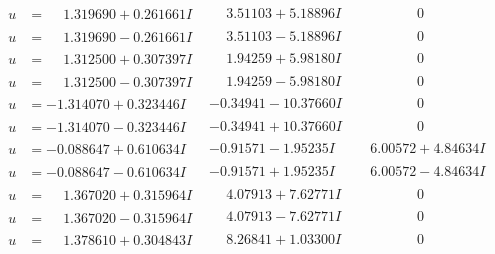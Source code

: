 \documentclass[1p]{elsarticle_modified}
\theoremstyle{definition}
\begin{document}
$$\begin{array}{c|c|c}
\begin{aligned}
u &= \phantom{-}1.319690 + 0.261661 I\end{aligned}
 & \phantom{-}3.51103 + 5.18896 I & \phantom{-0.000000 } 0 \\ \hline\begin{aligned}
u &= \phantom{-}1.319690 - 0.261661 I\end{aligned}
 & \phantom{-}3.51103 - 5.18896 I & \phantom{-0.000000 } 0 \\ \hline\begin{aligned}
u &= \phantom{-}1.312500 + 0.307397 I\end{aligned}
 & \phantom{-}1.94259 + 5.98180 I & \phantom{-0.000000 } 0 \\ \hline\begin{aligned}
u &= \phantom{-}1.312500 - 0.307397 I\end{aligned}
 & \phantom{-}1.94259 - 5.98180 I & \phantom{-0.000000 } 0 \\ \hline\begin{aligned}
u &= -1.314070 + 0.323446 I\end{aligned}
 & -0.34941 - 10.37660 I & \phantom{-0.000000 } 0 \\ \hline\begin{aligned}
u &= -1.314070 - 0.323446 I\end{aligned}
 & -0.34941 + 10.37660 I & \phantom{-0.000000 } 0 \\ \hline\begin{aligned}
u &= -0.088647 + 0.610634 I\end{aligned}
 & -0.91571 - 1.95235 I & \phantom{-}6.00572 + 4.84634 I \\ \hline\begin{aligned}
u &= -0.088647 - 0.610634 I\end{aligned}
 & -0.91571 + 1.95235 I & \phantom{-}6.00572 - 4.84634 I \\ \hline\begin{aligned}
u &= \phantom{-}1.367020 + 0.315964 I\end{aligned}
 & \phantom{-}4.07913 + 7.62771 I & \phantom{-0.000000 } 0 \\ \hline\begin{aligned}
u &= \phantom{-}1.367020 - 0.315964 I\end{aligned}
 & \phantom{-}4.07913 - 7.62771 I & \phantom{-0.000000 } 0 \\ \hline\begin{aligned}
u &= \phantom{-}1.378610 + 0.304843 I\end{aligned}
 & \phantom{-}8.26841 + 1.03300 I & \phantom{-0.000000 } 0 \\ \hline\begin{aligned}

\end{aligned}
\end{array}$$
\end{document}
